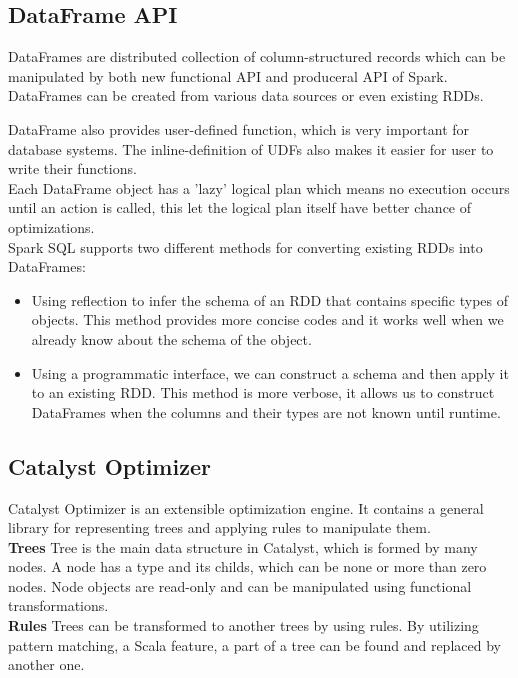 \subsection{DataFrame API}
DataFrames are distributed collection of column-structured records which can be manipulated by both new functional API and produceral API of Spark. DataFrames can be created from various data sources or even existing RDDs. 

DataFrame also provides user-defined function, which is very important for database systems. The inline-definition of UDFs also makes it easier for user to write their functions.\\
Each DataFrame object has a 'lazy' logical plan which means no execution occurs until an action is called, this let the logical plan itself have better chance of optimizations.\\ 

Spark SQL supports two different methods for converting existing RDDs into DataFrames:
\begin{itemize}
\item Using reflection to infer the schema of an RDD that contains specific types of objects. This method provides more concise codes and it works well when we already know about the schema of the object.
\item Using a programmatic interface, we can construct a schema and then apply it to an existing RDD. This method is more verbose, it allows us to construct DataFrames when the columns and their types are not known until runtime.
\end{itemize}

\subsection{Catalyst Optimizer}
Catalyst Optimizer is an extensible optimization engine. It contains a general library for representing trees and applying rules to manipulate them.\\
\textbf{Trees} Tree is the main data structure in Catalyst, which is formed by many nodes. A node has a type and its childs, which can be none or more than zero nodes. Node objects are read-only and can be manipulated using functional transformations.\\
\textbf{Rules} Trees can be transformed to another trees by using rules. By utilizing pattern matching, a Scala feature, a part of a tree can be found and replaced by another one.\\

